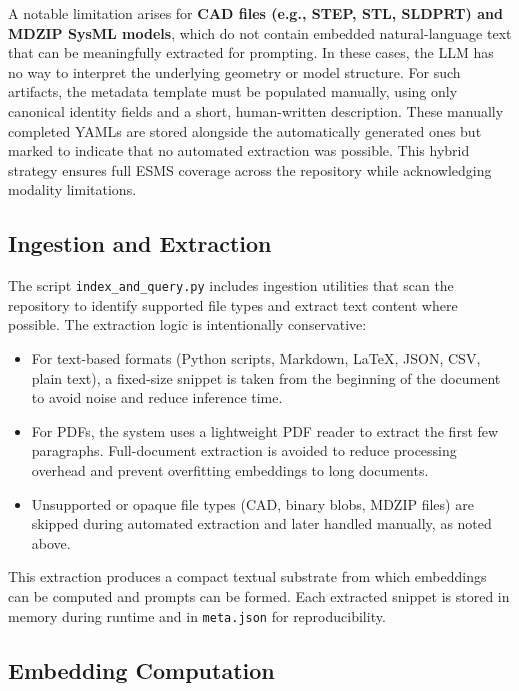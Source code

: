 \documentclass[12pt]{article}
\begin{document}
A notable limitation arises for \textbf{CAD files (e.g., STEP, STL, SLDPRT) and 
MDZIP SysML models}, which do not contain embedded natural-language text that 
can be meaningfully extracted for prompting. In these cases, the LLM has no way 
to interpret the underlying geometry or model structure. For such artifacts, 
the metadata template must be populated manually, using only canonical identity 
fields and a short, human-written description. These manually completed YAMLs 
are stored alongside the automatically generated ones but marked to indicate that 
no automated extraction was possible. This hybrid strategy ensures full ESMS 
coverage across the repository while acknowledging modality limitations.

\subsection{Ingestion and Extraction}

The script \texttt{index\_and\_query.py} includes ingestion utilities that scan 
the repository to identify supported file types and extract text content where 
possible. The extraction logic is intentionally conservative:

\begin{itemize}
    \item For text-based formats (Python scripts, Markdown, \LaTeX, JSON, CSV, 
    plain text), a fixed-size snippet is taken from the beginning of the document 
    to avoid noise and reduce inference time.
    \item For PDFs, the system uses a lightweight PDF reader to extract the first 
    few paragraphs. Full-document extraction is avoided to reduce processing 
    overhead and prevent overfitting embeddings to long documents.
    \item Unsupported or opaque file types (CAD, binary blobs, MDZIP files) are 
    skipped during automated extraction and later handled manually, as noted 
    above.
\end{itemize}

This extraction produces a compact textual substrate from which embeddings can 
be computed and prompts can be formed. Each extracted snippet is stored in 
memory during runtime and in \texttt{meta.json} for reproducibility.

\subsection{Embedding Computation}
\end{document}
